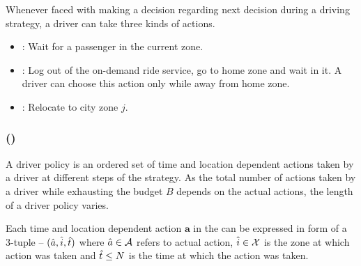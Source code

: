 Whenever faced with making a decision regarding next decision during a driving strategy, a driver can take three kinds
of actions.

\begin{itemize}
	\item {\getpassenger} \getpassengeraction: Wait for a passenger in the current zone. 
	\item {\gohome} \gohomeaction: Log out of the on-demand ride service, go to home zone and wait in it. A driver can
	choose this action only while away from home zone.
	\item {\relocate} \relocateaction: Relocate to city zone $j$.
\end{itemize}

\subsubsection{ (\policy)}

A driver policy is an ordered set of time and location dependent actions taken by a driver at different steps of the strategy. As the total number of actions taken by a driver while exhausting the budget $B$ depends on the actual actions, the length
of a driver policy {\policy} varies. 

Each time and location dependent action $\mathbf{a}$ in the {\policy} can be expressed in form of a 3-tuple -- $(\hat{a}, \hat{i}, \hat{t})$
where $\hat{a} \in \mathcal{A}$ refers to actual action, $\hat{i} \in \mathcal{X}$ is the zone at which action was taken and $\hat{t} \leq N$ is the 
time at which the action was taken.



